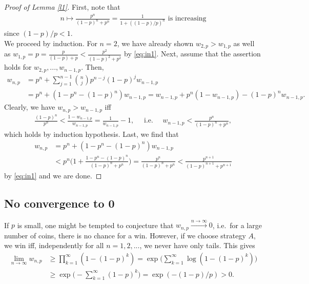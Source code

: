 \documentclass{article}
\theoremstyle{definition}
\theoremstyle{step} \newtheorem{step}{Step}
\begin{document}
\begin{proof}[Proof of Lemma \ref{l1}]
  First, note that
  \begin{align}\label{eq:in1}
    n \mapsto \frac{p^n}{(1-p)^n + p^n} = \frac{1}{1 + ((1-p)/p)^n}
    \text{ is increasing}
  \end{align}
  since $(1-p)/p < 1$. \\ We proceed by induction. For $n=2$, we have
  already shown $w_{2,p} > w_{1,p}$ as well as $w_{1,p} = p =
  \frac{p}{(1-p) + p} < \frac{p^2}{(1-p)^2 + p^2}$ by
  \eqref{eq:in1}. Next, assume that the assertion holds for
  $w_{2,p},...,w_{n-1,p}$. Then,
  \begin{align*}
    w_{n,p} & = p^n + \sum_{j=1}^{n-1} \binom n j p^{n-j} (1-p)^j
    w_{n-1,p} \\ & = p^n + (1 - p^n - (1-p)^n)w_{n-1,p} = w_{n-1,p} +
    p^n(1 - w_{n-1,p}) - (1-p)^n w_{n-1,p}.
  \end{align*}
  Clearly, we have $w_{n,p} > w_{n-1,p}$ iff
  \begin{align*}
    \frac{(1-p)^n}{p^n} < \frac{1 - w_{n-1,p}}{w_{n-1,p}} =
    \frac{1}{w_{n-1,p}} - 1, \quad \text{ i.e. } \quad w_{n-1,p} <
    \frac{p^n}{(1-p)^n + p^n},
  \end{align*}
  which holds by induction hypothesis. Last, we find that
  \begin{align*}
    w_{n,p} & = p^n + (1 - p^n - (1-p)^n)w_{n-1,p} \\ & < p^n\Big(1 +
    \frac{1-p^n - (1-p)^n}{(1-p)^n + p^n}\Big) = \frac{p^n}{(1-p)^n +
      p^n} < \frac{p^{n+1}}{(1-p)^{n+1} + p^{n+1}}
  \end{align*}
  by \eqref{eq:in1} and we are done.
\end{proof}

\subsection*{No convergence to 0}
If $p$ is small, one might be tempted to conjecture that $w_{n,p}
\xrightarrow{n\to\infty} 0$, i.e.\ for a large number of coins, there
is no chance for a win. However, if we choose strategy $A$, we win
iff, independently for all $n=1,2,...$, we never have only tails. This
gives
\begin{align*}
  \lim_{n\to\infty} w_{n,p} & \geq \prod_{k=1}^\infty (1 - (1-p)^k) =
  \exp\big( \sum_{k=1}^\infty \log (1 - (1-p)^k)\big) \\ & \geq
  \exp\big(- \sum_{k=1}^\infty (1-p)^k\big) = \exp(-(1-p)/p) > 0.
\end{align*}
\end{document}
